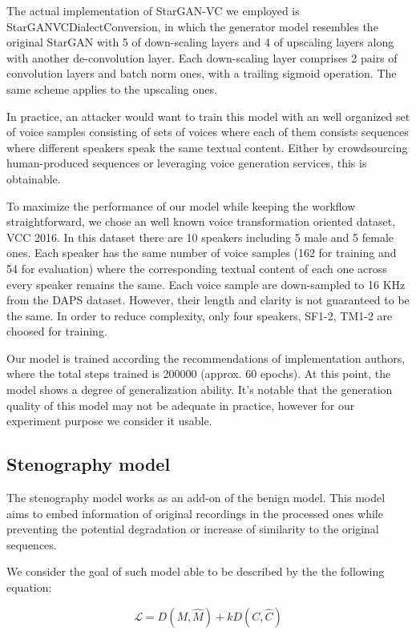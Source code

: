 \documentclass[journal]{IEEEtran} %
\begin{document}
The actual implementation of StarGAN-VC we employed is StarGANVCDialectConversion, in which the generator model resembles the original StarGAN with 5 of down-scaling layers and 4 of upscaling layers along with another de-convolution layer. Each down-scaling layer comprises 2 pairs of convolution layers and batch norm ones, with a trailing sigmoid operation. The same scheme applies to the upscaling ones.

In practice, an attacker would want to train this model with an well organized set of voice samples consisting of sets of voices where each of them consists sequences where different speakers speak the same textual content. Either by crowdsourcing human-produced sequences or leveraging voice generation services, this is obtainable.

To maximize the performance of our model while keeping the workflow straightforward, we chose an well known voice transformation oriented dataset, VCC 2016. In this dataset there are 10 speakers including 5 male and 5 female ones. Each speaker has the same number of voice samples (162 for training and 54 for evaluation) where the corresponding textual content of each one across every speaker remains the same. Each voice sample are down-sampled to 16 KHz from the DAPS dataset. However, their length and clarity is not guaranteed to be the same. In order to reduce complexity, only four speakers, SF1-2, TM1-2 are choosed for training.

Our model is trained according the recommendations of implementation authors, where the total steps trained is 200000 (approx. 60 epochs). At this point, the model shows a degree of generalization ability. It's notable that the generation quality of this model may not be adequate in practice, however for our experiment purpose we consider it usable.

\subsection{Stenography model}

The stenography model works as an add-on of the benign model. This model aims to embed information of original recordings in the processed ones while preventing the potential degradation or increase of similarity to the original sequences.

We consider the goal of such model able to be described by the the following equation:

\begin{equation}
    \label{eqn:st_q_loss}
    \mathcal{L} = D( M , \hat{M} ) + k D( C , \hat{C} )
\end{equation}
\end{document}
